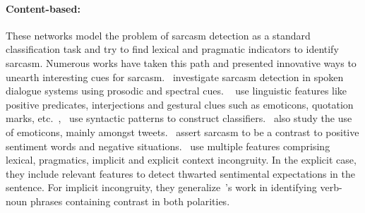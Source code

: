 \documentclass[11pt]{article}
\begin{document}
\paragraph{Content-based: } These networks model the problem of sarcasm detection as a standard classification task and try to find lexical and pragmatic indicators to identify sarcasm. Numerous works have taken this path and presented innovative ways to unearth interesting cues for sarcasm.~ investigate sarcasm detection in spoken dialogue systems using prosodic and spectral cues. ~ use linguistic features like positive predicates, interjections and gestural clues such as emoticons, quotation marks, etc.~,~ use syntactic patterns to construct classifiers.~ also study the use of emoticons, mainly amongst tweets.~ assert sarcasm to be a contrast to positive sentiment words and negative situations.~ use multiple features comprising lexical, pragmatics, implicit and explicit context incongruity. In the explicit case, they include relevant features to detect thwarted sentimental expectations in the sentence. For implicit incongruity, they generalize~'s work in identifying verb-noun phrases containing contrast in both polarities.  
\end{document}
